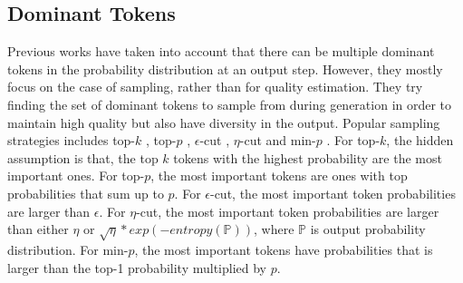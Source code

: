 \subsection{Dominant Tokens} \label{sec:sampling}
Previous works have taken into account that there can be multiple dominant tokens in the probability distribution at an output step. However, they mostly focus on the case of sampling, rather than for quality estimation. They try finding the set of dominant tokens to sample from during generation in order to maintain high quality but also have diversity in the output. Popular sampling strategies includes top-$k$ \cite{fan-etal-2018-hierarchical}, top-$p$ \cite{holtzmancurious}, $\epsilon$-cut \cite{hewitt-etal-2022-truncation}, $\eta$-cut \cite{hewitt-etal-2022-truncation} and min-$p$ \cite{nguyen2024turning}. For top-$k$, the hidden assumption is that, the top $k$ tokens with the highest probability are the most important ones. For top-$p$, the most important tokens are ones with top probabilities that sum up to $p$. 
For $\epsilon$-cut, the most important token probabilities are larger than $\epsilon$. 
For $\eta$-cut, the most important token probabilities are larger than either $\eta$ or $\sqrt{\eta} * exp(-entropy(\mathbb{P}))$, where $\mathbb{P}$ is output probability distribution.
For min-$p$, the most important tokens have probabilities that is larger than the top-1 probability multiplied by $p$.


